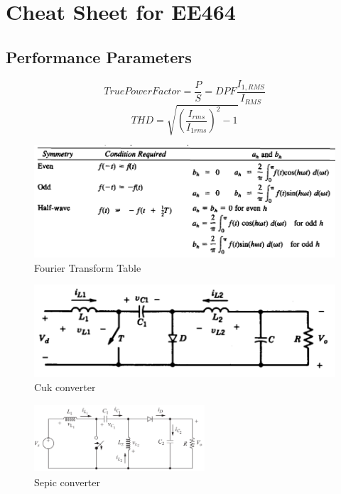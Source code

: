 \documentclass[twocolumn, ]{article}
\begin{document}
\section*{\small Cheat Sheet for EE464}

\subsection*{\small Performance Parameters}
\begin{equation*}
True Power Factor=\frac{P}{S}=DPF \frac{I_{1,RMS}}{I_{RMS}}
\end{equation*}
\begin{equation*}
THD=\sqrt{(\frac{I_{rms}}{I_{1rms}})^2-1}
\end{equation*}



  \begin{figure}[!ht]
	\includegraphics[scale=0.30]{Fourier.png}
	\caption{Fourier Transform Table}
\end{figure}

\begin{figure}[!ht]
	\includegraphics[scale=0.20]{cuk_converter.png}
	\caption{Cuk converter}
\end{figure}

\begin{figure}[!ht]
	\includegraphics[width=2.5in,height=1in]{sepic_operation.png}
	\caption{Sepic converter}
\end{figure}
\end{document}
